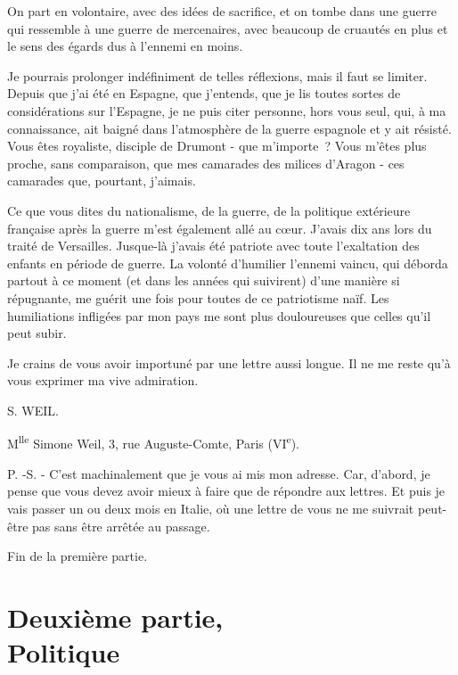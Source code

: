 \documentclass[french,twoside]{book} %
\begin{document}
On part en volontaire, avec des idées de sacrifice, et on tombe dans une guerre qui ressemble à une guerre de mercenaires, avec beaucoup de cruautés en plus et le sens des égards dus à l'ennemi en moins.\par
Je pourrais prolonger indéfiniment de telles réflexions, mais il faut se limiter. Depuis que j'ai été en Espagne, que j'entends, que je lis toutes sortes de considérations sur l'Espagne, je ne puis citer personne, hors vous seul, qui, à ma connaissance, ait baigné dans l'atmosphère de la guerre espagnole et y ait résisté. Vous êtes royaliste, disciple de Drumont - que m'importe ? Vous m'êtes plus proche, sans comparaison, que mes camarades des milices d'Aragon - ces camarades que, pourtant, j'aimais.\par
Ce que vous dites du nationalisme, de la guerre, de la politique extérieure française après la guerre m'est également allé au cœur. J'avais dix ans lors du traité de Versailles. Jusque-là j'avais été patriote avec toute l'exaltation des enfants en période de guerre. La volonté d'humilier l'ennemi vaincu, qui déborda partout à ce moment (et dans les années qui suivirent) d'une manière si répugnante, me guérit une fois pour toutes de ce patriotisme naïf. Les humiliations infligées par mon pays me sont plus douloureuses que celles qu'il peut subir.\par
Je crains de vous avoir importuné par une lettre aussi longue. Il ne me reste qu'à vous exprimer ma vive admiration.\par
S. WEIL.\par
\par
M\textsuperscript{lle} Simone Weil, 3, rue Auguste-Comte, Paris (VI\textsuperscript{e}).\par
P. -S. - C'est machinalement que je vous ai mis mon adresse. Car, d'abord, je pense que vous devez avoir mieux à faire que de répondre aux lettres. Et puis je vais passer un ou deux mois en Italie, où une lettre de vous ne me suivrait peut-être pas sans être arrêtée au passage.\par
Fin de la première partie.
\section[{Deuxième partie, Politique}]{Deuxième partie, \\
Politique}\renewcommand{\leftmark}{Deuxième partie, \\
Politique}

\noindent \par
\par
\end{document}
